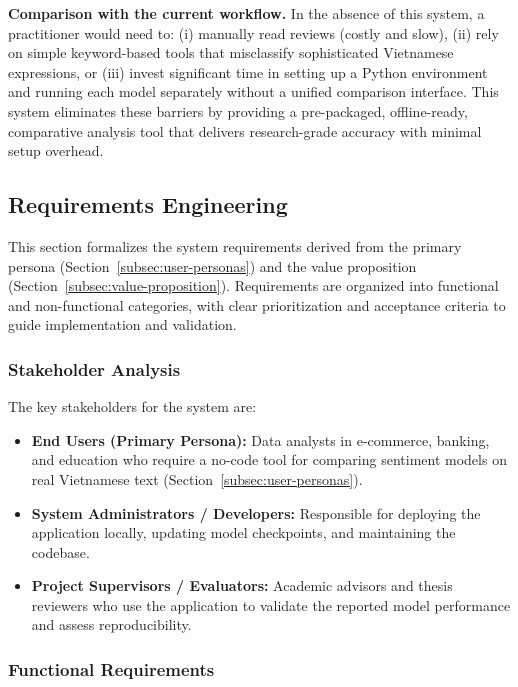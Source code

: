 \documentclass[12pt]{report} %
\begin{document}
\textbf{Comparison with the current workflow.} In the absence of this system, a practitioner would need to: (i) manually read reviews (costly and slow), (ii) rely on simple keyword-based tools that misclassify sophisticated Vietnamese expressions, or (iii) invest significant time in setting up a Python environment and running each model separately without a unified comparison interface. This system eliminates these barriers by providing a pre-packaged, offline-ready, comparative analysis tool that delivers research-grade accuracy with minimal setup overhead.

\subsection{Requirements Engineering}
\label{subsec:requirements}

This section formalizes the system requirements derived from the primary persona (Section~\ref{subsec:user-personas}) and the value proposition (Section~\ref{subsec:value-proposition}). Requirements are organized into functional and non-functional categories, with clear prioritization and acceptance criteria to guide implementation and validation.

\subsubsection{Stakeholder Analysis}

The key stakeholders for the system are:
\begin{itemize}
    \item \textbf{End Users (Primary Persona):} Data analysts in e-commerce, banking, and education who require a no-code tool for comparing sentiment models on real Vietnamese text (Section~\ref{subsec:user-personas}).
    \item \textbf{System Administrators / Developers:} Responsible for deploying the application locally, updating model checkpoints, and maintaining the codebase.
    \item \textbf{Project Supervisors / Evaluators:} Academic advisors and thesis reviewers who use the application to validate the reported model performance and assess reproducibility.
\end{itemize}

\subsubsection{Functional Requirements}
\end{document}
